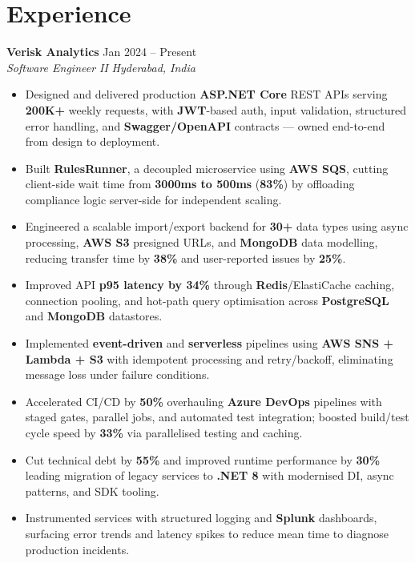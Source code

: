 \documentclass[10pt,letterpaper]{article}
\newcommand{\resumeSubheading}[4]{%
  \textbf{#1} \hfill #2 \\
  \textit{#3} \hfill \textit{#4} \\
}
\begin{document}
\section*{Experience}
\resumeSubheading{Verisk Analytics}{Jan 2024 -- Present}{Software Engineer II}{Hyderabad, India}
\begin{itemize}
    \item Designed and delivered production \textbf{ASP.NET Core} REST APIs serving \textbf{200K+} weekly requests, with \textbf{JWT}-based auth, input validation, structured error handling, and \textbf{Swagger/OpenAPI} contracts --- owned end-to-end from design to deployment.
    \item Built \textbf{RulesRunner}, a decoupled microservice using \textbf{AWS SQS}, cutting client-side wait time from \textbf{3000ms to 500ms} (\textbf{83\%}) by offloading compliance logic server-side for independent scaling.
    \item Engineered a scalable import/export backend for \textbf{30+} data types using async processing, \textbf{AWS S3} presigned URLs, and \textbf{MongoDB} data modelling, reducing transfer time by \textbf{38\%} and user-reported issues by \textbf{25\%}.
    \item Improved API \textbf{p95 latency by 34\%} through \textbf{Redis}/ElastiCache caching, connection pooling, and hot-path query optimisation across \textbf{PostgreSQL} and \textbf{MongoDB} datastores.
    \item Implemented \textbf{event-driven} and \textbf{serverless} pipelines using \textbf{AWS SNS + Lambda + S3} with idempotent processing and retry/backoff, eliminating message loss under failure conditions.
    \item Accelerated CI/CD by \textbf{50\%} overhauling \textbf{Azure DevOps} pipelines with staged gates, parallel jobs, and automated test integration; boosted build/test cycle speed by \textbf{33\%} via parallelised testing and caching.
    \item Cut technical debt by \textbf{55\%} and improved runtime performance by \textbf{30\%} leading migration of legacy services to \textbf{.NET 8} with modernised DI, async patterns, and SDK tooling.
    \item Instrumented services with structured logging and \textbf{Splunk} dashboards, surfacing error trends and latency spikes to reduce mean time to diagnose production incidents.
\end{itemize}

\end{document}
